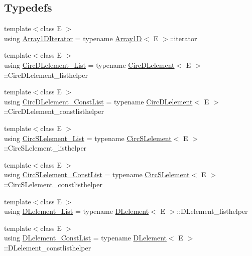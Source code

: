 \subsection*{Typedefs}
\begin{DoxyCompactItemize}
\item 
{\footnotesize template$<$class E $>$ }\\using \hyperlink{namespacebridges_1_1datastructure_a078ef2c625e37f0fb85ff7b112647c21}{Array1\+D\+Iterator} = typename \hyperlink{classbridges_1_1datastructure_1_1_array1_d}{Array1D}$<$ E $>$\+::iterator
\item 
{\footnotesize template$<$class E $>$ }\\using \hyperlink{namespacebridges_1_1datastructure_ab12c4e35f7131413ee6a5759273d94ac}{Circ\+D\+Lelement\+\_\+\+List} = typename \hyperlink{classbridges_1_1datastructure_1_1_circ_d_lelement}{Circ\+D\+Lelement}$<$ E $>$\+::Circ\+D\+Lelement\+\_\+listhelper
\item 
{\footnotesize template$<$class E $>$ }\\using \hyperlink{namespacebridges_1_1datastructure_a72ff4f4c6720d9c7f9fb29141cc341c1}{Circ\+D\+Lelement\+\_\+\+Const\+List} = typename \hyperlink{classbridges_1_1datastructure_1_1_circ_d_lelement}{Circ\+D\+Lelement}$<$ E $>$\+::Circ\+D\+Lelement\+\_\+constlisthelper
\item 
{\footnotesize template$<$class E $>$ }\\using \hyperlink{namespacebridges_1_1datastructure_a0369e2cdb6565569ce7fe329c66d1faf}{Circ\+S\+Lelement\+\_\+\+List} = typename \hyperlink{classbridges_1_1datastructure_1_1_circ_s_lelement}{Circ\+S\+Lelement}$<$ E $>$\+::Circ\+S\+Lelement\+\_\+listhelper
\item 
{\footnotesize template$<$class E $>$ }\\using \hyperlink{namespacebridges_1_1datastructure_a607154461f3493b40cb0c0b6217d97cb}{Circ\+S\+Lelement\+\_\+\+Const\+List} = typename \hyperlink{classbridges_1_1datastructure_1_1_circ_s_lelement}{Circ\+S\+Lelement}$<$ E $>$\+::Circ\+S\+Lelement\+\_\+constlisthelper
\item 
{\footnotesize template$<$class E $>$ }\\using \hyperlink{namespacebridges_1_1datastructure_a3bc755a675bce8fd5e0fefd10bb72977}{D\+Lelement\+\_\+\+List} = typename \hyperlink{classbridges_1_1datastructure_1_1_d_lelement}{D\+Lelement}$<$ E $>$\+::D\+Lelement\+\_\+listhelper
\item 
{\footnotesize template$<$class E $>$ }\\using \hyperlink{namespacebridges_1_1datastructure_a89a5bc532207f3279ad747ba91e75527}{D\+Lelement\+\_\+\+Const\+List} = typename \hyperlink{classbridges_1_1datastructure_1_1_d_lelement}{D\+Lelement}$<$ E $>$\+::D\+Lelement\+\_\+constlisthelper

\end{DoxyCompactItemize}
